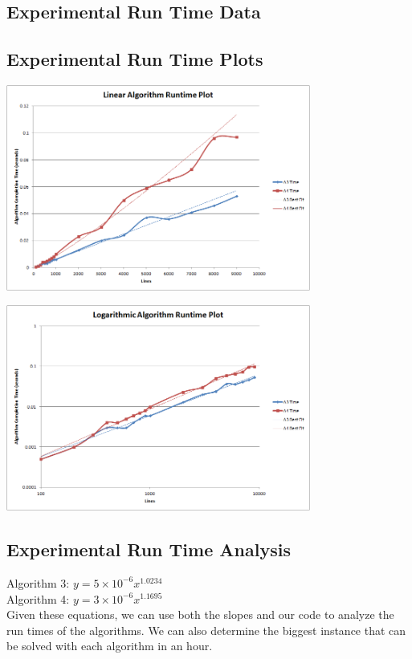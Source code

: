 \documentclass{article}
\begin{document}
\subsection*{Experimental Run Time Data}


\pagebreak

\subsection*{Experimental Run Time Plots}
\centerline{\includegraphics[width=0.75\textwidth]{plot1.png}}
\centerline{\includegraphics[width=0.75\textwidth]{plot2.png}}

\pagebreak

\subsection*{Experimental Run Time Analysis}
Algorithm 3: $y=5 \times 10^{-6}x^{1.0234}$\\
Algorithm 4: $y=3 \times 10^{-6}x^{1.1695}$\\

Given these equations, we can use both the slopes and our code to analyze the run times of the algorithms. We can also determine the biggest instance that can be solved with each algorithm in an hour.
\end{document}
